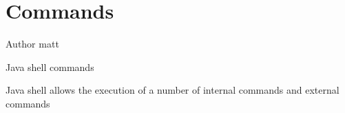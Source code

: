 \hypertarget{group__commands}{}\section{Commands}
\label{group__commands}
\begin{DoxyAuthor}{Author}
matt
\end{DoxyAuthor}
Java shell commands

Java shell allows the execution of a number of internal commands and external commands 